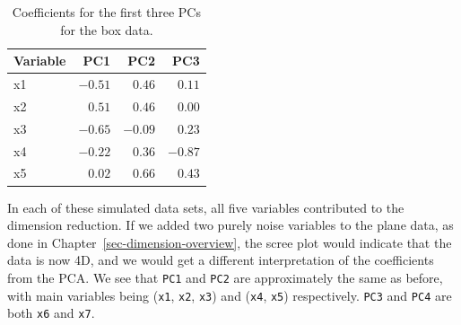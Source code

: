 \documentclass[
  letterpaper,
]{book}
\newenvironment{Shaded}{\begin{snugshade}}{\end{snugshade}}
\newcommand{\ControlFlowTok}[1]{\textcolor[rgb]{0.00,0.23,0.31}{#1}}
\newcommand{\DecValTok}[1]{\textcolor[rgb]{0.68,0.00,0.00}{#1}}
\newcommand{\FunctionTok}[1]{\textcolor[rgb]{0.28,0.35,0.67}{#1}}
\newcommand{\NormalTok}[1]{\textcolor[rgb]{0.00,0.23,0.31}{#1}}
\newcommand{\OtherTok}[1]{\textcolor[rgb]{0.00,0.23,0.31}{#1}}
\newcommand{\SpecialCharTok}[1]{\textcolor[rgb]{0.37,0.37,0.37}{#1}}
\begin{document}
\hypertarget{tbl-box-pcs}{}
\begin{longtable}{lrrr}
\caption{\label{tbl-box-pcs}Coefficients for the first three PCs for the box data. }\tabularnewline

\toprule
Variable & PC1 & PC2 & PC3 \\ 
\midrule
x1 & $-0.51$ & $0.46$ & $0.11$ \\ 
x2 & $0.51$ & $0.46$ & $0.00$ \\ 
x3 & $-0.65$ & $-0.09$ & $0.23$ \\ 
x4 & $-0.22$ & $0.36$ & $-0.87$ \\ 
x5 & $0.02$ & $0.66$ & $0.43$ \\ 
\bottomrule
\end{longtable}

In each of these simulated data sets, all five variables contributed to
the dimension reduction. If we added two purely noise variables to the
plane data, as done in Chapter~\ref{sec-dimension-overview}, the scree
plot would indicate that the data is now 4D, and we would get a
different interpretation of the coefficients from the PCA. We see that
\texttt{PC1} and \texttt{PC2} are approximately the same as before, with
main variables being (\texttt{x1}, \texttt{x2}, \texttt{x3}) and
(\texttt{x4}, \texttt{x5}) respectively. \texttt{PC3} and \texttt{PC4}
are both \texttt{x6} and \texttt{x7}.

\begin{Shaded}
\end{Shaded}
\end{document}
